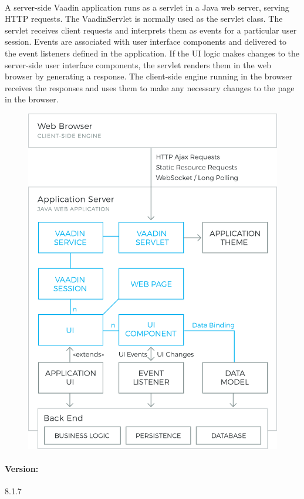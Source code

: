 \documentclass{article}
\begin{document}
			\paragraph{}A server-side Vaadin application runs as a servlet in a Java web server, serving HTTP requests. The VaadinServlet is normally used as the servlet class. The servlet receives client requests and interprets them as events for a particular user session. Events are associated with user interface components and delivered to the event listeners defined in the application. If the UI logic makes changes to the server-side user interface components, the servlet renders them in the web browser by generating a response. The client-side engine running in the browser receives the responses and uses them to make any necessary changes to the page in the browser.
			\begin{figure}[H]
			\begin{center}
			\includegraphics[width=.8\linewidth]{Images/Appendix/vaadin3.png}
			\label{fig:V3}
			\end{center}
			\end{figure}
			\paragraph{Version:} 8.1.7
\end{document}
